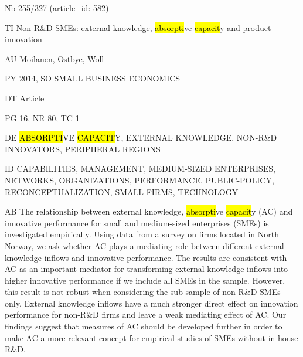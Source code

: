 \documentclass[a4paper]{article}
\begin{document}
\vspace*{-2cm}
Nb \tabto{0cm}255/327 (article\_id: 582)\par
TI \tabto{0cm}Non-R\&D SMEs: external knowledge, \hl{absorpti}ve \hl{capacit}y and product innovation\par
AU \tabto{0cm}Moilanen, Ostbye, Woll\par
PY \tabto{0cm}2014, SO SMALL BUSINESS ECONOMICS\par
DT \tabto{0cm}Article\par
PG \tabto{0cm}16, NR 80, TC 1\par
DE \tabto{0cm}\hl{ABSORPTI}VE \hl{CAPACIT}Y, EXTERNAL KNOWLEDGE, NON-R\&D INNOVATORS, PERIPHERAL REGIONS\par
ID \tabto{0cm}CAPABILITIES, MANAGEMENT, MEDIUM-SIZED ENTERPRISES, NETWORKS, ORGANIZATIONS, PERFORMANCE, PUBLIC-POLICY, RECONCEPTUALIZATION, SMALL FIRMS, TECHNOLOGY\par
AB \tabto{0cm}The relationship between external knowledge, \hl{absorpti}ve \hl{capacit}y (AC) and innovative performance for small and medium-sized enterprises (SMEs) is investigated empirically. Using data from a survey on firms located in North Norway, we ask whether AC plays a mediating role between different external knowledge inflows and innovative performance. The results are consistent with AC as an important mediator for transforming external knowledge inflows into higher innovative performance if we include all SMEs in the sample. However, this result is not robust when considering the sub-sample of non-R\&D SMEs only. External knowledge inflows have a much stronger direct effect on innovation performance for non-R\&D firms and leave a weak mediating effect of AC. Our findings suggest that measures of AC should be developed further in order to make AC a more relevant concept for empirical studies of SMEs without in-house R\&D.\par
\clearpage
\end{document}
